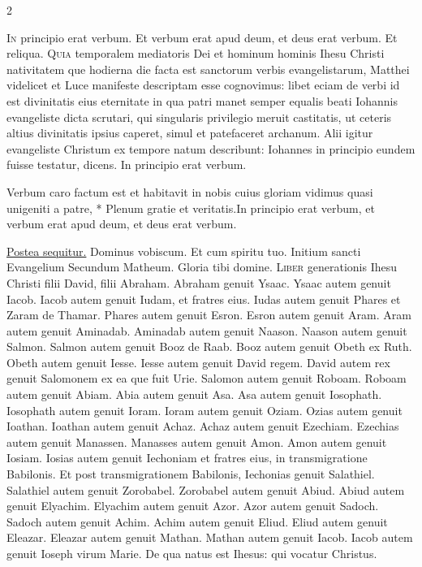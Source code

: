 \begin{multicols*}{2}
\begin{responsory}
\end{responsory}%
\lettrine[lines=2]{\zallmancaps \color{Blue} I}{n} principio erat verbum. Et verbum erat apud deum, et deus erat verbum. Et reliqua.
\lettrine[lines=2]{\zallmancaps \color{Red} Q}{uia} temporalem mediatoris Dei et hominum hominis Ihesu Christi nativitatem que hodierna die facta est sanctorum verbis evangelistarum, Matthei videlicet et Luce manifeste descriptam esse cognovimus: libet eciam de verbi id est divinitatis eius eternitate in qua patri manet semper equalis beati Iohannis evangeliste dicta scrutari, qui singularis privilegio meruit castitatis, ut ceteris altius divinitatis ipsius caperet, simul et patefaceret archanum. Alii igitur evangeliste Christum ex tempore natum describunt: Iohannes in principio eundem fuisse testatur, dicens. In principio erat verbum.
\begin{responsory-doxology}
{Verbum caro factum est et habitavit in nobis cuius gloriam vidimus quasi unigeniti a patre, * Plenum gratie et veritatis.}{In principio erat verbum, et verbum erat apud deum, et deus erat verbum.}
\end{responsory-doxology}%
\newline \ul{Postea sequitur.} Dominus vobiscum. Et cum spiritu tuo.
\newline Initium sancti Evangelium Secundum Matheum. Gloria tibi domine.
\lettrine[lines=2]{\zallmancaps \color{Blue} L}{iber} generationis Ihesu Christi filii David, filii Abraham. Abraham genuit Ysaac. Ysaac autem genuit Iacob. Iacob autem genuit Iudam, et fratres eius. Iudas autem genuit Phares et Zaram de Thamar. Phares autem genuit Esron. Esron autem genuit Aram. Aram autem genuit Aminadab. Aminadab autem genuit Naason. Naason autem genuit Salmon. Salmon autem genuit Booz de Raab. Booz autem genuit Obeth ex Ruth. Obeth autem genuit Iesse. Iesse autem genuit David regem. David autem rex genuit Salomonem ex ea que fuit Urie. Salomon autem genuit Roboam. Roboam autem genuit Abiam. Abia autem genuit Asa. Asa autem genuit Iosophath. Iosophath autem genuit Ioram. Ioram autem genuit Oziam. Ozias autem genuit Ioathan. Ioathan autem genuit Achaz. Achaz autem genuit Ezechiam. Ezechias autem genuit Manassen. Manasses autem genuit Amon. Amon autem genuit Iosiam. Iosias autem genuit Iechoniam et fratres eius, in transmigratione Babilonis. Et post transmigrationem Babilonis, Iechonias genuit Salathiel. Salathiel autem genuit Zorobabel. Zorobabel autem genuit Abiud. Abiud autem genuit Elyachim. Elyachim autem genuit Azor. Azor autem genuit Sadoch. Sadoch autem genuit Achim. Achim autem genuit Eliud. Eliud autem genuit Eleazar. Eleazar autem genuit Mathan. Mathan autem genuit Iacob. Iacob autem genuit Ioseph virum Marie. De qua natus est Ihesus: qui vocatur Christus.

\end{multicols*}

